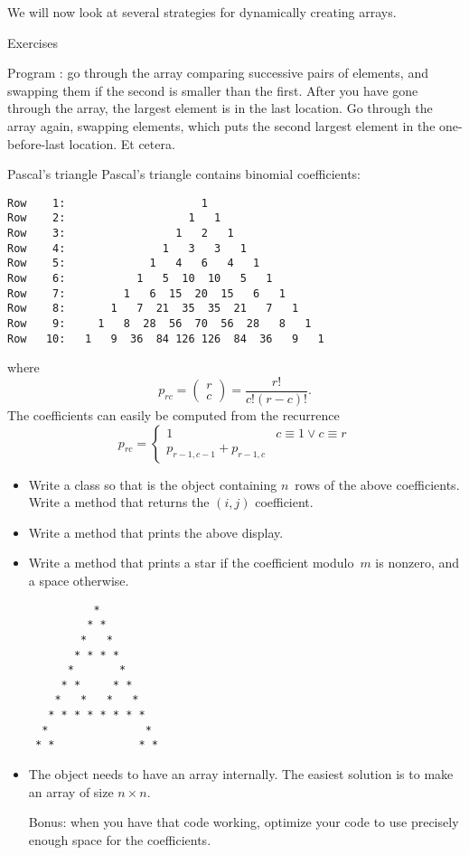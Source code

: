We will now look at several strategies for dynamically creating arrays.

 {Exercises}

\begin{exercise}
  Program : go through the array comparing
  successive pairs of elements, and swapping them if the second is
  smaller than the first. After you have gone through the array, the
  largest element is in the last location. Go through the array again,
  swapping elements, which puts the second largest element in the
  one-before-last location. Et cetera.
\end{exercise}

\begin{block}{Pascal's triangle}
  \label{sl:pascal-def}
  \small
  Pascal's triangle contains binomial coefficients:
\begin{verbatim}
Row    1:                     1
Row    2:                   1   1
Row    3:                 1   2   1
Row    4:               1   3   3   1
Row    5:             1   4   6   4   1
Row    6:           1   5  10  10   5   1
Row    7:         1   6  15  20  15   6   1
Row    8:       1   7  21  35  35  21   7   1
Row    9:     1   8  28  56  70  56  28   8   1
Row   10:   1   9  36  84 126 126  84  36   9   1
\end{verbatim}
where \[ p_{rc} = \begin{pmatrix} r\\c \end{pmatrix} = \frac{r!}{c!(r-c)! }. \]
The coefficients can easily be computed from the recurrence
\[ p_{rc} = 
\begin{cases}
  1&c\equiv 1\vee c\equiv r\\
  p_{r-1,c-1}+p_{r-1,c}
\end{cases}
\]
\end{block}

\begin{exercise}
  \label{ex:pascal-ex}
  \small
  \begin{itemize}
  \item 
    Write a class  so that  is the object
    containing $n$~rows of the above coefficients. Write a method
     that returns the $(i,j)$ coefficient.
  \item
    Write a method  that prints the above display.
  \item
    Write a method  that prints a star if the
    coefficient modulo~$m$ is nonzero, and a space otherwise.
\begin{verbatim}
          *
         * *
        *   *
       * * * *
      *       *
     * *     * *
    *   *   *   *
   * * * * * * * *
  *               *
 * *             * *
\end{verbatim}
  \item
    The object needs to have an array internally. The easiest solution
    is to make an array of size $n\times n$.

    Bonus: when you have that code working, optimize your code to use
    precisely enough space for the coefficients.
  \end{itemize}
\end{exercise}

